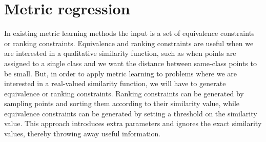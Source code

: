 \documentclass[a4paper,titlepage]{article}
\begin{document}




%

\pagebreak
\section{Metric regression}
\label{metric_regression}


In existing metric learning methods the input is a set of equivalence constraints or ranking constraints. Equivalence and ranking constraints are useful when we are interested in a qualitative similarity function, such as when points are assigned to a single class and we want the distance between same-class points to be small. But, in order to apply metric learning to problems where we are interested in a real-valued similarity function, we will have to generate equivalence or ranking constraints. Ranking constraints can be generated by sampling points and sorting them according to their similarity value, while equivalence constraints can be generated by setting a threshold on the similarity value. This approach introduces extra parameters and ignores the exact similarity values, thereby throwing away useful information.

\end{document}
